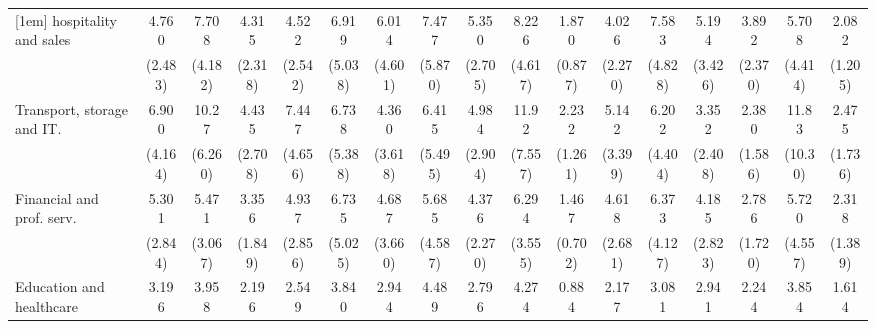 {\begin{tabular}{l*{16}{c}}
[1em]
hospitality and sales&       4.760\sym{**} &       7.708\sym{***}&       4.315\sym{**} &       4.522\sym{**} &       6.919\sym{**} &       6.014\sym{*}  &       7.477\sym{*}  &       5.350\sym{***}&       8.226\sym{***}&       1.870         &       4.026\sym{*}  &       7.583\sym{**} &       5.194\sym{*}  &       3.892\sym{*}  &       5.708\sym{*}  &       2.082         \\
                    &     (2.483)         &     (4.182)         &     (2.318)         &     (2.542)         &     (5.038)         &     (4.601)         &     (5.870)         &     (2.705)         &     (4.617)         &     (0.877)         &     (2.270)         &     (4.828)         &     (3.426)         &     (2.370)         &     (4.414)         &     (1.205)         \\
[1em]
Transport, storage and IT.&       6.900\sym{**} &       10.27\sym{***}&       4.435\sym{*}  &       7.447\sym{**} &       6.738\sym{*}  &       4.360         &       6.415\sym{*}  &       4.984\sym{**} &       11.92\sym{***}&       2.232         &       5.142\sym{*}  &       6.202\sym{*}  &       3.352         &       2.380         &       11.83\sym{**} &       2.475         \\
                    &     (4.164)         &     (6.260)         &     (2.708)         &     (4.656)         &     (5.388)         &     (3.618)         &     (5.495)         &     (2.904)         &     (7.557)         &     (1.261)         &     (3.399)         &     (4.404)         &     (2.408)         &     (1.586)         &     (10.30)         &     (1.736)         \\
[1em]
Financial and prof. serv.&       5.301\sym{**} &       5.471\sym{**} &       3.356\sym{*}  &       4.937\sym{**} &       6.735\sym{*}  &       4.687\sym{*}  &       5.685\sym{*}  &       4.376\sym{**} &       6.294\sym{**} &       1.467         &       4.618\sym{**} &       6.373\sym{**} &       4.185\sym{*}  &       2.786         &       5.720\sym{*}  &       2.318         \\
                    &     (2.844)         &     (3.067)         &     (1.849)         &     (2.856)         &     (5.025)         &     (3.660)         &     (4.587)         &     (2.270)         &     (3.555)         &     (0.702)         &     (2.681)         &     (4.127)         &     (2.823)         &     (1.720)         &     (4.557)         &     (1.389)         \\
[1em]
Education and healthcare&       3.196\sym{*}  &       3.958\sym{*}  &       2.196         &       2.549         &       3.840         &       2.944         &       4.489         &       2.796         &       4.274\sym{*}  &       0.884         &       2.177         &       3.081         &       2.941         &       2.244         &       3.854         &       1.614         \\

\end{tabular}}
